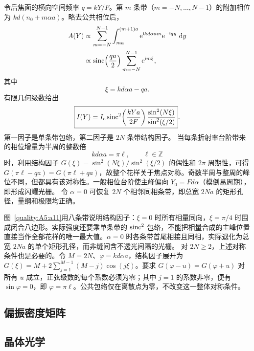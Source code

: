 \begin{advsolution}
令后焦面的横向空间频率
$q=kY/F$。第 $m$ 条带（$m=-N,\ldots,N-1$）的附加相位为
$kd(n_0+m\alpha a)$。略去公共相位后，
\[
\begin{aligned}
 A(Y)&\propto
 \sum_{m=-N}^{N-1}
 \int_{ma}^{(m+1)a}
 \mathrm e^{\mathrm i kd\alpha am}\mathrm e^{-\mathrm i qy}\,\mathop{}\!\mathrm d y\\
 &\propto
 \operatorname{sinc}\!\left(\frac{qa}{2}\right)
 \sum_{m=-N}^{N-1}\mathrm e^{\mathrm i m\xi},
\end{aligned}
\]
其中
\[
 \xi=kd\alpha a-qa.
\]
有限几何级数给出
\[
 \boxed{I(Y)=I_c
 \operatorname{sinc}^2\!\left(\frac{kYa}{2F}\right)
 \frac{\sin^2(N\xi)}{\sin^2(\xi/2)}}.
\]
第一因子是单条带包络，第二因子是 $2N$ 条带结构因子。
当每条折射率台阶带来的相位增量为半周的整数倍
\[
 \boxed{kd\alpha a=\pi\ell,\qquad \ell\in\mathbb Z}
\]
时，利用结构因子 $G(\xi)=\sin^2(N\xi)/\sin^2(\xi/2)$ 的偶性和 $2\pi$ 周期性，可得 $G(\pi\ell-qa)=G(\pi\ell+qa)$，故整个花样关于焦点对称。奇数半周与整周的峰位不同，但都具有该对称性。一般相位台阶使主峰偏向
$Y_0=F d\alpha$（模倒易周期），即形成闪耀光栅。
令 $\alpha=0$ 可恢复 $2N$ 个相邻同相条带，即总宽 $2Na$ 的矩形孔径，量纲和极限均正确。


图~\ref{quality:A5:a11}用八条带说明结构因子：$\xi=0$ 时所有相量同向，$\xi=\pi/4$ 时围成闭合八边形。实际强度还要乘单条带的 $\operatorname{sinc}^2$ 包络，不能把相量合成的主峰位置直接当作全部花样的唯一最大值。$\alpha=0$ 时各条带首尾相接且同相，实际退化为总宽 $2Na$ 的单个矩形孔径，而非缝间含不透光间隔的光栅。
对 $2N\ge2$，上述对称条件也是必要的。令 $M=2N$、$\varphi=kd\alpha a$，结构因子展开为 $G(\xi)=M+2\sum_{j=1}^{M-1}(M-j)\cos(j\xi)$。要求 $G(\varphi-u)=G(\varphi+u)$ 对所有 $u$ 成立，正弦级数的每个系数必须为零；其中 $j=1$ 的系数非零，便有 $\sin\varphi=0$，即 $\varphi=\pi\ell$。公共包络仅在离散点为零，不改变这一整体对称条件。
\end{advsolution}

\subsection{偏振密度矩阵}



\subsection{晶体光学}

